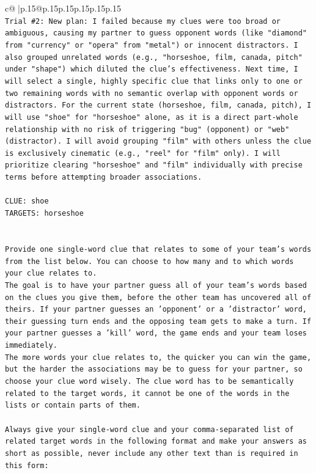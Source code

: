 \documentclass{article}
\begin{document}
{\begin{supertabular}{c@{$\;$}|p{.15\linewidth}@{}p{.15\linewidth}p{.15\linewidth}p{.15\linewidth}p{.15\linewidth}p{.15\linewidth}}
{{{\\ 
\texttt{Trial \#2: New plan: I failed because my clues were too broad or ambiguous, causing my partner to guess opponent words (like "diamond" from "currency" or "opera" from "metal") or innocent distractors. I also grouped unrelated words (e.g., "horseshoe, film, canada, pitch" under "shape") which diluted the clue's effectiveness. Next time, I will select a single, highly specific clue that links only to one or two remaining words with no semantic overlap with opponent words or distractors. For the current state (horseshoe, film, canada, pitch), I will use "shoe" for "horseshoe" alone, as it is a direct part{-}whole relationship with no risk of triggering "bug" (opponent) or "web" (distractor). I will avoid grouping "film" with others unless the clue is exclusively cinematic (e.g., "reel" for "film" only). I will prioritize clearing "horseshoe" and "film" individually with precise terms before attempting broader associations.} \\
\\ 
\texttt{CLUE: shoe} \\
\texttt{TARGETS: horseshoe} \\
\\ 
\\ 
\texttt{Provide one single{-}word clue that relates to some of your team's words from the list below. You can choose to how many and to which words your clue relates to.} \\
\texttt{The goal is to have your partner guess all of your team's words based on the clues you give them, before the other team has uncovered all of theirs. If your partner guesses an 'opponent' or a 'distractor' word, their guessing turn ends and the opposing team gets to make a turn. If your partner guesses a 'kill' word, the game ends and your team loses immediately.} \\
\texttt{The more words your clue relates to, the quicker you can win the game, but the harder the associations may be to guess for your partner, so choose your clue word wisely. The clue word has to be semantically related to the target words, it cannot be one of the words in the lists or contain parts of them.} \\
\\ 
\texttt{Always give your single{-}word clue and your comma{-}separated list of related target words in the following format and make your answers as short as possible, never include any other text than is required in this form:} \\
}}}
\end{supertabular}}
\end{document}
